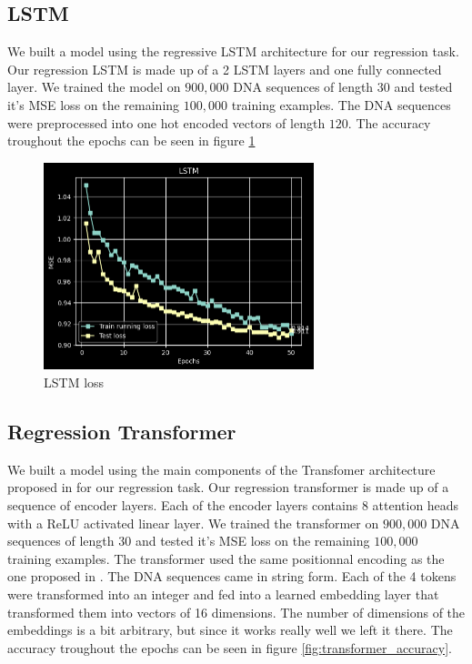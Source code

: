 \documentclass{article}
\begin{document}
\subsection{LSTM}
We built a model using the regressive LSTM architecture for our regression task. Our regression LSTM is made up of a 2 LSTM layers and one fully connected layer. We trained the model on $900, 000$ DNA sequences of length $30$ and tested it's MSE loss on the remaining $100,000$ training examples. The DNA sequences were preprocessed into one hot encoded vectors of length $120$. The accuracy troughout the epochs can be seen in figure \ref{fig:lstm}
\begin{figure} \label{fig:lstm}
    \caption{LSTM loss} \center
    \includegraphics[width=0.7\textwidth]{images/lstm.png}
\end{figure}

\subsection{Regression Transformer}
We built a model using the main components of the Transfomer architecture proposed in \cite{transformers} for our regression task. Our regression transformer is made up of a sequence of encoder layers. Each of the encoder layers contains 8 attention heads with a ReLU activated linear layer. We trained the transformer on $900, 000$ DNA sequences of length $30$ and tested it's MSE loss on the remaining $100,000$ training examples. The transformer used the same positionnal encoding as the one proposed in \cite{transformers}. The DNA sequences came in string form. Each of the 4 tokens were transformed into an integer and fed into a learned embedding layer that transformed them into vectors of 16 dimensions. The number of dimensions of the embeddings is a bit arbitrary, but since it works really well we left it there. The accuracy troughout the epochs can be seen in figure \ref{fig:transformer_accuracy}. 
\end{document}
